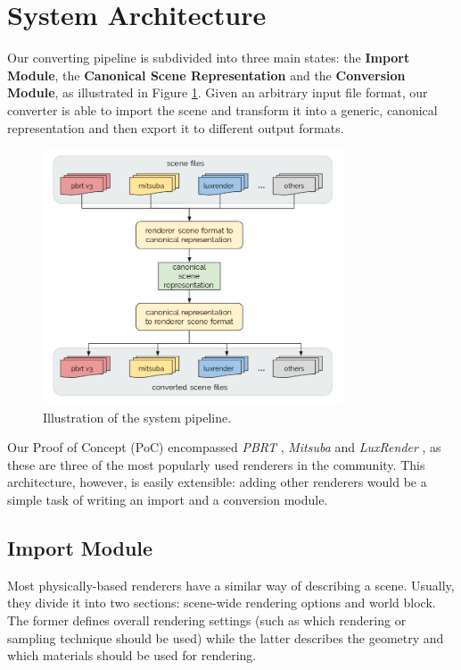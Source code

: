 \section{System Architecture} \label{systemarch}
Our converting pipeline is subdivided into three main states: the \textbf{Import
Module}, the \textbf{Canonical Scene Representation} and the \textbf{Conversion
Module}, as illustrated in Figure \ref{fig:sysarch}. Given an arbitrary input
file format, our converter is able to import the scene and transform it into a
generic, canonical representation and then export it to different output
formats.

\begin{figure}[h]
\centering
\includegraphics[width=3.5in]{figs/3_system_architecture/architecture.png}
\caption{Illustration of the system pipeline.}
\label{fig:sysarch}
\end{figure}

Our Proof of Concept (PoC) encompassed \textit{PBRT} \cite{pbrt}, \textit{Mitsuba}
\cite{mitsuba} and \textit{LuxRender} \cite{luxrender}, as these are three of
the most popularly used renderers in the community. This architecture, however,
is easily extensible: adding other renderers would be a simple task of writing
an import and a conversion module.

\subsection{Import Module}
Most physically-based renderers have a similar way of describing a scene.
Usually, they divide it into two sections: scene-wide rendering options and
world block. The former defines overall rendering settings (such as which
rendering or sampling technique should be used) while the latter describes the
geometry and which materials should be used for rendering.

